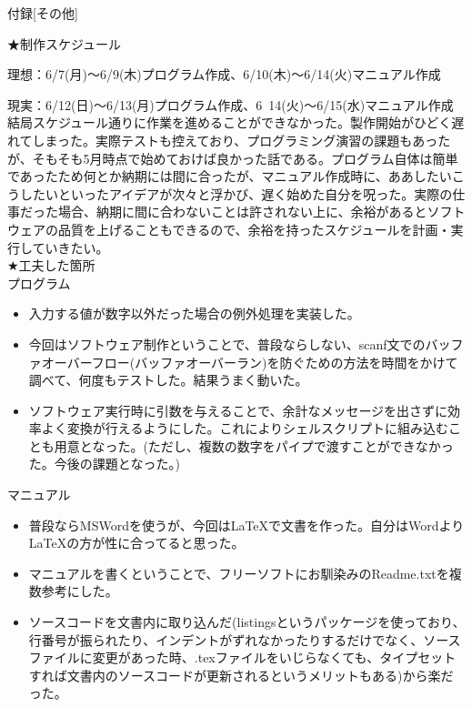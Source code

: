\documentclass{jsarticle}
\begin{document}
\newpage
{\noindent 付録[その他]\\}

{\Large\noindent ★制作スケジュール}

理想：6/7(月)〜6/9(木)プログラム作成、6/10(木)〜6/14(火)マニュアル作成

現実：6/12(日)〜6/13(月)プログラム作成、6~14(火)〜6/15(水)マニュアル作成\\
結局スケジュール通りに作業を進めることができなかった。製作開始がひどく遅れてしまった。実際テストも控えており、プログラミング演習の課題もあったが、そもそも5月時点で始めておけば良かった話である。プログラム自体は簡単であったため何とか納期には間に合ったが、マニュアル作成時に、ああしたいこうしたいといったアイデアが次々と浮かび、遅く始めた自分を呪った。実際の仕事だった場合、納期に間に合わないことは許されない上に、余裕があるとソフトウェアの品質を上げることもできるので、余裕を持ったスケジュールを計画・実行していきたい。\\


{\Large\noindent ★工夫した箇所}\\
プログラム
\begin{itemize}
\item 入力する値が数字以外だった場合の例外処理を実装した。
\item 今回はソフトウェア制作ということで、普段ならしない、scanf文でのバッファオーバーフロー(バッファオーバーラン)を防ぐための方法を時間をかけて調べて、何度もテストした。結果うまく動いた。
\item ソフトウェア実行時に引数を与えることで、余計なメッセージを出さずに効率よく変換が行えるようにした。これによりシェルスクリプトに組み込むことも用意となった。(ただし、複数の数字をパイプで渡すことができなかった。今後の課題となった。)\\
\end{itemize}
マニュアル
\begin{itemize}
\item 普段ならMSWordを使うが、今回はLaTeXで文書を作った。自分はWordよりLaTeXの方が性に合ってると思った。
\item マニュアルを書くということで、フリーソフトにお馴染みのReadme.txtを複数参考にした。
\item ソースコードを文書内に取り込んだ(listingsというパッケージを使っており、行番号が振られたり、インデントがずれなかったりするだけでなく、ソースファイルに変更があった時、.texファイルをいじらなくても、タイプセットすれば文書内のソースコードが更新されるというメリットもある)から楽だった。
\end{itemize}
\end{document}
